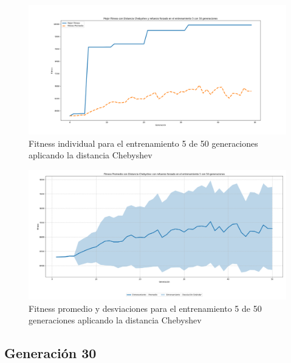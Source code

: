\documentclass[conference]{IEEEtran}
\begin{document}
\begin{figure}[H]
    \centering
    \includegraphics[width=0.9 \linewidth]{Chebyshev/Fitness_individual_50Gen/Fitness_5_Cheby_50Gen.png}
    \caption{Fitness individual para el entrenamiento 5 de 50 generaciones aplicando la distancia Chebyshev}
    \label{fig:cheb_5_50}
\end{figure}
\begin{figure}[H]
    \centering
    \includegraphics[width=0.9 \linewidth]{Chebyshev/Fitness_individual_50Gen/Fitness_5_Cheby_50Gen_Sombra.png}
    \caption{Fitness promedio y desviaciones para el entrenamiento 5 de 50 generaciones aplicando la distancia Chebyshev}
    \label{fig:cheb_5_50_sombra}
\end{figure}

\subsection{Generación 30}
\setcounter{figure}{0}
\renewcommand{\thefigure}{S\arabic{figure}B-C}
\end{document}
